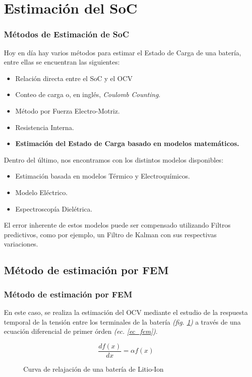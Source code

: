 \documentclass[10pt]{beamer}
\theoremstyle{remark}
\theoremstyle{definition}
\begin{document}
\section{Estimación del SoC}

\begin{frame}[allowframebreaks]
  \frametitle{Métodos de Estimación de SoC}

  Hoy en día hay varios métodos para estimar el Estado de Carga de una batería,
  entre ellas se encuentran las siguientes:
  \begin{itemize}
	\item Relación directa entre el SoC y el OCV
	\item Conteo de carga o, en inglés, \emph{Coulomb Counting}.
	\item Método por Fuerza Electro-Motriz.
	\item Resistencia Interna.
	\item \textbf{Estimación del Estado de Carga basado en modelos matemáticos.}
  \end{itemize}

  \framebreak

  Dentro del último, nos encontramos con los distintos modelos disponibles:

  \begin{itemize}
	\item Estimación basada en modelos Térmico y Electroquímicos.
	\item Modelo Eléctrico.
	\item Espectroscopía Dielétrica.
  \end{itemize}

  El error inherente de estos modelos puede ser compensado utilizando Filtros
  predictivos, como por ejemplo, un Filtro de Kalman con sus respectivas
  variaciones.

\end{frame}

\subsection{Método de estimación por FEM}

\begin{frame}[allowframebreaks]
	\frametitle{Método de estimación por FEM}

	En este caso, se realiza la estimación del OCV mediante el estudio de la
	respuesta temporal de la tensión entre los terminales de la batería
	\emph{(fig. \ref{fig:relax_emf})} a través
	de una ecuación diferencial de primer órden \emph{(ec. \ref{ec_fem})}.

	\begin{equation}
	  \frac{df(x)}{dx} = \alpha f(x)
	  \label{ec_fem}
	\end{equation}

	\begin{figure}[h!]
	  \centering
	  \caption{Curva de relajación de una batería de Litio-Ion}
	  \label{fig:relax_emf}
	\end{figure}

\end{frame}
\end{document}

